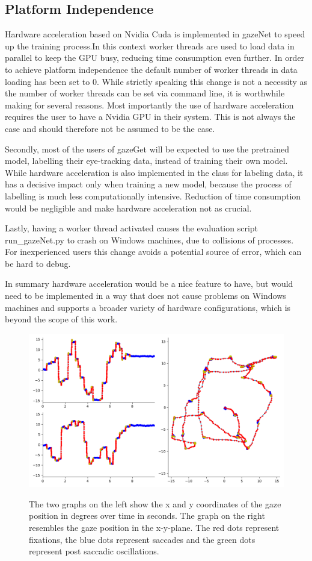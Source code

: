 \documentclass[conference]{IEEEtran}
\begin{document}
\subsection{Platform Independence}
Hardware acceleration based on Nvidia Cuda is implemented in gazeNet to speed up the training process.In this context worker threads are used to load data in parallel to keep the GPU busy, reducing time consumption even further. In order to achieve platform independence the default number of worker threads in data loading has been set to 0. While strictly speaking this change is not a necessity as the number of worker threads can be set via command line, it is worthwhile making for several reasons. Most importantly the use of hardware acceleration requires the user to have a Nvidia GPU in their system. This is not always the case and should therefore not be assumed to be the case.

Secondly, most of the users of gazeGet will be expected to use the pretrained model, labelling their eye-tracking data, instead of training their own model. While hardware acceleration is also implemented in the class for labeling data, it has a decisive impact only when training a new model, because the process of labelling is much less computationally intensive. Reduction of time consumption would be negligible and make hardware acceleration not as crucial.

Lastly, having a worker thread activated causes the evaluation script run\_gazeNet.py to crash on Windows machines, due to collisions of processes. For inexperienced users this change avoids a potential source of error, which can be hard to debug.

In summary hardware acceleration would be a nice feature to have, but would need to be implemented in a way that does not cause problems on Windows machines and supports a broader variety of hardware configurations, which is beyond the scope of this work.

\begin{figure}
    \centering
    \includegraphics[width=0.7\linewidth]
    {TH34_img_Europe_labelled_MN}
    \label{fig:lund2013}
    \caption{The two graphs on the left show the x and y coordinates of the gaze position in degrees over time in seconds. The graph on the right resembles the gaze position in the x-y-plane. The red dots represent fixations, the blue dots represent saccades and the green dots represent post saccadic oscillations.}
\end{figure}
\end{document}
